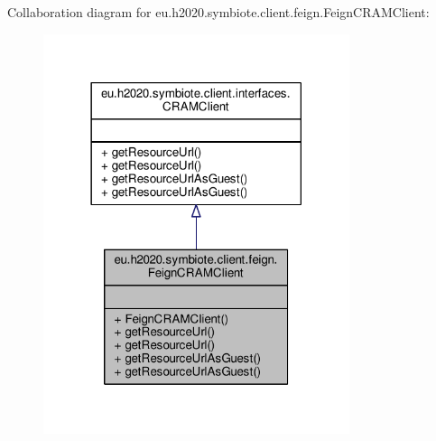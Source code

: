 Collaboration diagram for eu.\+h2020.\+symbiote.\+client.\+feign.\+Feign\+C\+R\+A\+M\+Client\+:
\nopagebreak
\begin{figure}[H]
\begin{center}
\leavevmode
\includegraphics[width=254pt]{classeu_1_1h2020_1_1symbiote_1_1client_1_1feign_1_1FeignCRAMClient__coll__graph}
\end{center}
\end{figure}
